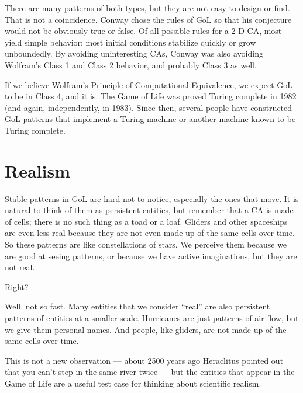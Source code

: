 \documentclass[12pt]{book}
\theoremstyle{exercise}
\begin{document}

There are many patterns of both types, but they are not easy to
design or find.  That is not a coincidence.  Conway chose the
rules of GoL so that his conjecture would not be obviously
true or false.  Of all possible rules for a 2-D CA, most
yield simple behavior: most initial conditions stabilize quickly
or grow unboundedly.  By avoiding uninteresting CAs, Conway
was also avoiding Wolfram's Class 1 and Class 2 behavior, and
probably Class 3 as well.

If we believe Wolfram's Principle of Computational Equivalence, we
expect GoL to be in Class 4, and it is.  The Game of Life was proved
Turing complete in 1982 (and again, independently, in 1983).
Since then, several people have constructed GoL patterns that implement
a Turing machine or another machine known to be Turing complete.



\section{Realism}

Stable patterns in GoL are hard not to notice, especially the ones
that move.  It is natural to think of them as persistent entities, but
remember that a CA is made of cells; there is no such thing as a toad
or a loaf.  Gliders and other spaceships are even less real because
they are not even made up of the same cells over time.  So these
patterns are like constellations of stars.  We perceive them because
we are good at seeing patterns, or because we have active
imaginations, but they are not real.


Right?

Well, not so fast.  Many entities that we consider ``real'' are also
persistent patterns of entities at a smaller scale.  Hurricanes are
just patterns of air flow, but we give them personal names.  And
people, like gliders, are not made up of the same cells over time.


This is not a new observation --- about 2500 years ago Heraclitus
pointed out that you can't step in the same river twice --- but the
entities that appear in the Game of Life are a useful test case for
thinking about scientific realism.

\end{document}
